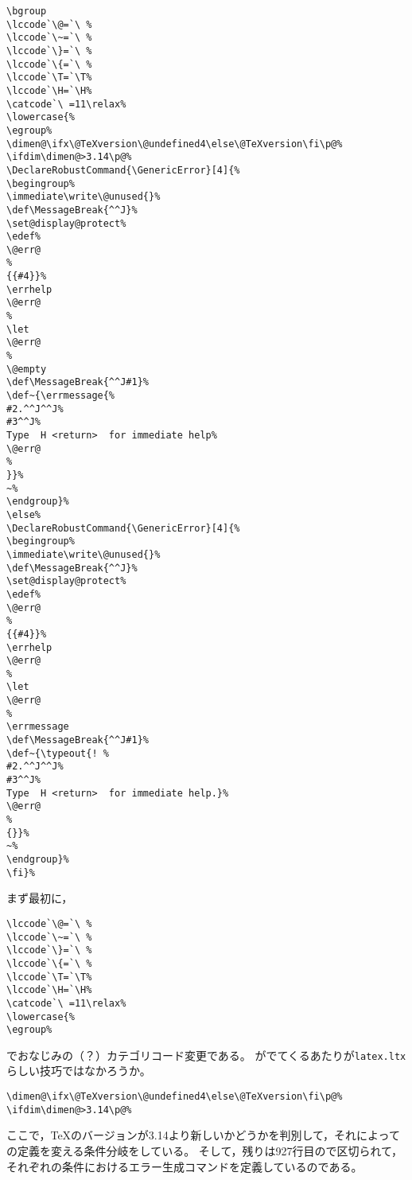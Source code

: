 \documentclass[autodetect-engine,dvipdfmx]{jsarticle}
\begin{document}
\latexltx
\begin{lstlisting}[firstnumber=893]
\bgroup
\lccode`\@=`\ %
\lccode`\~=`\ %
\lccode`\}=`\ %
\lccode`\{=`\ %
\lccode`\T=`\T%
\lccode`\H=`\H%
\catcode`\ =11\relax%
\lowercase{%
\egroup%
\dimen@\ifx\@TeXversion\@undefined4\else\@TeXversion\fi\p@%
\ifdim\dimen@>3.14\p@%
\DeclareRobustCommand{\GenericError}[4]{%
\begingroup%
\immediate\write\@unused{}%
\def\MessageBreak{^^J}%
\set@display@protect%
\edef%
\@err@                                                                 %
{{#4}}%
\errhelp
\@err@                                                                 %
\let
\@err@                                                                 %
\@empty
\def\MessageBreak{^^J#1}%
\def~{\errmessage{%
#2.^^J^^J%
#3^^J%
Type  H <return>  for immediate help%
\@err@                                                                 %
}}%
~%
\endgroup}%
\else%
\DeclareRobustCommand{\GenericError}[4]{%
\begingroup%
\immediate\write\@unused{}%
\def\MessageBreak{^^J}%
\set@display@protect%
\edef%
\@err@                                                                 %
{{#4}}%
\errhelp
\@err@                                                                 %
\let
\@err@                                                                 %
\errmessage
\def\MessageBreak{^^J#1}%
\def~{\typeout{! %
#2.^^J^^J%
#3^^J%
Type  H <return>  for immediate help.}%
\@err@                                                                 %
{}}%
~%
\endgroup}%
\fi}%
\end{lstlisting}

まず最初に，

\latexltx
\begin{lstlisting}[firstnumber=894]
\lccode`\@=`\ %
\lccode`\~=`\ %
\lccode`\}=`\ %
\lccode`\{=`\ %
\lccode`\T=`\T%
\lccode`\H=`\H%
\catcode`\ =11\relax%
\lowercase{%
\egroup%
\end{lstlisting}
でおなじみの（？）カテゴリコード変更である。
がでてくるあたりが\texttt{latex.ltx}らしい技巧ではなかろうか。


\latexltx
\begin{lstlisting}[firstnumber=903]
\dimen@\ifx\@TeXversion\@undefined4\else\@TeXversion\fi\p@%
\ifdim\dimen@>3.14\p@%
\end{lstlisting}

ここで，\TeX のバージョンが3.14より新しいかどうかを判別して，それによっての定義を変える条件分岐をしている。
そして，残りは927行目ので区切られて，それぞれの条件におけるエラー生成コマンドを定義しているのである。
\end{document}
